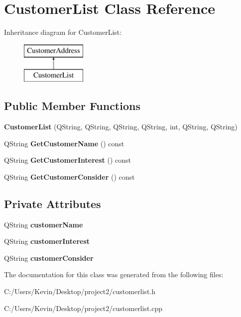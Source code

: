 \hypertarget{class_customer_list}{}\section{Customer\+List Class Reference}
\label{class_customer_list}
Inheritance diagram for Customer\+List\+:\begin{figure}[H]
\begin{center}
\leavevmode
\includegraphics[height=2.000000cm]{class_customer_list}
\end{center}
\end{figure}
\subsection*{Public Member Functions}
\begin{DoxyCompactItemize}
\item 
\mbox{\label{class_customer_list_a7d4dd3e97f8f4f0ffe4c4e78e8287961}} 
{\bfseries Customer\+List} (Q\+String, Q\+String, Q\+String, Q\+String, int, Q\+String, Q\+String)
\item 
\mbox{\label{class_customer_list_a1664cba8e8d632f423af29173d7f129d}} 
Q\+String {\bfseries Get\+Customer\+Name} () const
\item 
\mbox{\label{class_customer_list_ad9c2e6078f443188109172ba3aa194f2}} 
Q\+String {\bfseries Get\+Customer\+Interest} () const
\item 
\mbox{\label{class_customer_list_a0b5b29392131069645ec640754442134}} 
Q\+String {\bfseries Get\+Customer\+Consider} () const
\end{DoxyCompactItemize}
\subsection*{Private Attributes}
\begin{DoxyCompactItemize}
\item 
\mbox{\label{class_customer_list_a2203f4af4c4162680163a4ffa4cae09a}} 
Q\+String {\bfseries customer\+Name}
\item 
\mbox{\label{class_customer_list_a7319e26a3596056691229268cc2473a0}} 
Q\+String {\bfseries customer\+Interest}
\item 
\mbox{\label{class_customer_list_a990624e3c437de3b0771aadffac045ac}} 
Q\+String {\bfseries customer\+Consider}
\end{DoxyCompactItemize}


The documentation for this class was generated from the following files\+:\begin{DoxyCompactItemize}
\item 
C\+:/\+Users/\+Kevin/\+Desktop/project2/customerlist.\+h\item 
C\+:/\+Users/\+Kevin/\+Desktop/project2/customerlist.\+cpp\end{DoxyCompactItemize}
